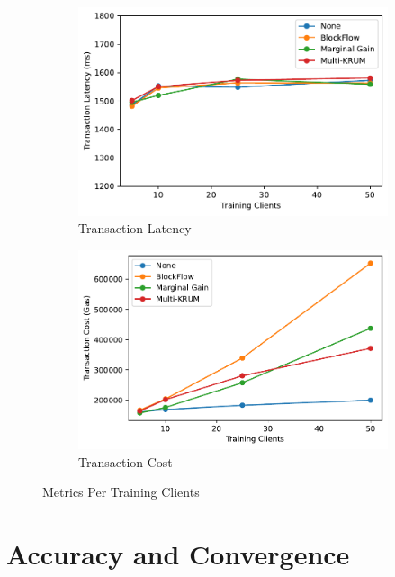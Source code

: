 \begin{figure}[!ht]
\begin{subfigure}[b]{0.49\textwidth}
        \centering
        \includegraphics[width=\textwidth]{graphics/clients/tx_latency.pdf}
        \caption{Transaction Latency}
    \end{subfigure}
    \hfill
    \begin{subfigure}[b]{0.49\textwidth}
        \centering
        \includegraphics[width=\textwidth]{graphics/clients/tx_cost.pdf}
        \caption{Transaction Cost}
    \end{subfigure}
    \caption{Metrics Per Training Clients}
    \label{fig:clients_metrics}
\end{figure}

\section{Accuracy and Convergence}

